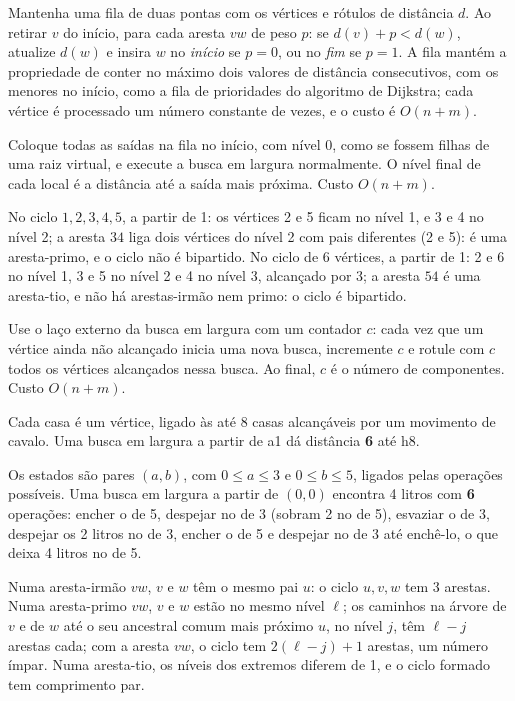  Mantenha uma fila de duas pontas com os vértices e rótulos de distância $d$. Ao retirar $v$ do início, para cada aresta $vw$ de peso $p$: se $d(v)+p<d(w)$, atualize $d(w)$ e insira $w$ no \emph{início} se $p=0$, ou no \emph{fim} se $p=1$. A fila mantém a propriedade de conter no máximo dois valores de distância consecutivos, com os menores no início, como a fila de prioridades do algoritmo de Dijkstra; cada vértice é processado um número constante de vezes, e o custo é $O(n+m)$.

 Coloque todas as saídas na fila no início, com nível 0, como se fossem filhas de uma raiz virtual, e execute a busca em largura normalmente. O nível final de cada local é a distância até a saída mais próxima. Custo $O(n+m)$.

 No ciclo $1,2,3,4,5$, a partir de 1: os vértices 2 e 5 ficam no nível 1, e 3 e 4 no nível 2; a aresta $34$ liga dois vértices do nível 2 com pais diferentes (2 e 5): é uma aresta-primo, e o ciclo não é bipartido. No ciclo de 6 vértices, a partir de 1: 2 e 6 no nível 1, 3 e 5 no nível 2 e 4 no nível 3, alcançado por 3; a aresta $54$ é uma aresta-tio, e não há arestas-irmão nem primo: o ciclo é bipartido.

 Use o laço externo da busca em largura com um contador $c$: cada vez que um vértice ainda não alcançado inicia uma nova busca, incremente $c$ e rotule com $c$ todos os vértices alcançados nessa busca. Ao final, $c$ é o número de componentes. Custo $O(n+m)$.

 Cada casa é um vértice, ligado às até 8 casas alcançáveis por um movimento de cavalo. Uma busca em largura a partir de a1 dá distância \textbf{6} até h8.

 Os estados são pares $(a,b)$, com $0\le a\le3$ e $0\le b\le5$, ligados pelas operações possíveis. Uma busca em largura a partir de $(0,0)$ encontra 4 litros com \textbf{6} operações: encher o de 5, despejar no de 3 (sobram 2 no de 5), esvaziar o de 3, despejar os 2 litros no de 3, encher o de 5 e despejar no de 3 até enchê-lo, o que deixa 4 litros no de 5.

 Numa aresta-irmão $vw$, $v$ e $w$ têm o mesmo pai $u$: o ciclo $u,v,w$ tem 3 arestas. Numa aresta-primo $vw$, $v$ e $w$ estão no mesmo nível $\ell$; os caminhos na árvore de $v$ e de $w$ até o seu ancestral comum mais próximo $u$, no nível $j$, têm $\ell-j$ arestas cada; com a aresta $vw$, o ciclo tem $2(\ell-j)+1$ arestas, um número ímpar. Numa aresta-tio, os níveis dos extremos diferem de 1, e o ciclo formado tem comprimento par.

